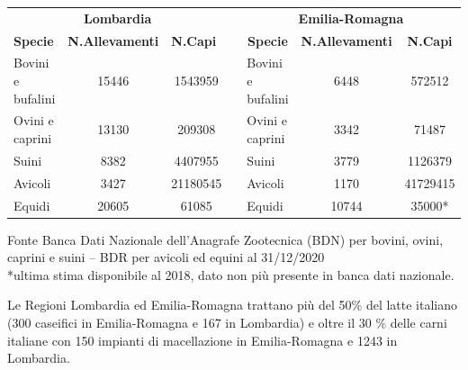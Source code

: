 \documentclass[
  12pt,
]{article}
\begin{document}
\begin{center}
\begin{table}[H]
\begin{tabular}{|l|c|c|l|l|c|c|}
\cline{1-3} \cline{5-7}
\multicolumn{3}{|c|}{\textbf{Lombardia}}                                                               &  & \multicolumn{3}{c|}{\textbf{Emilia-Romagna}}                                    \\ \cline{1-3} \cline{5-7} 
\textbf{Specie}   & \multicolumn{1}{l|}{\textbf{N.Allevamenti}} & \multicolumn{1}{l|}{\textbf{N.Capi}} &  & \multicolumn{1}{c|}{\textbf{Specie}} & \textbf{N.Allevamenti} & \textbf{N.Capi} \\ \cline{1-3} \cline{5-7} 
Bovini e bufalini & 15446                                       & 1543959                              &  & Bovini e bufalini                    & 6448                   & 572512          \\ \cline{1-3} \cline{5-7} 
Ovini e caprini   & 13130                                       & 209308                               &  & Ovini e caprini                      & 3342                   & 71487           \\ \cline{1-3} \cline{5-7} 
Suini             & 8382                                        & 4407955                              &  & Suini                                & 3779                   & 1126379         \\ \cline{1-3} \cline{5-7} 
Avicoli           & 3427                                        & 21180545                             &  & Avicoli                              & 1170                   & 41729415        \\ \cline{1-3} \cline{5-7} 
Equidi            & 20605                                       & 61085                                &  & Equidi                               & 10744                  & 35000*          \\ \cline{1-3} \cline{5-7} 
\end{tabular}
\tiny Fonte Banca Dati Nazionale dell’Anagrafe Zootecnica (BDN) per bovini, ovini, caprini e suini – BDR per avicoli ed equini al 31/12/2020  \\
*ultima stima disponibile al 2018, dato non più presente in banca dati nazionale.

\end{table}
\end{center}

Le Regioni Lombardia ed Emilia-Romagna trattano più del 50\% del latte
italiano (300 caseifici in Emilia-Romagna e 167 in Lombardia) e oltre il
30 \% delle carni italiane con 150 impianti di macellazione in
Emilia-Romagna e 1243 in Lombardia.
\end{document}
